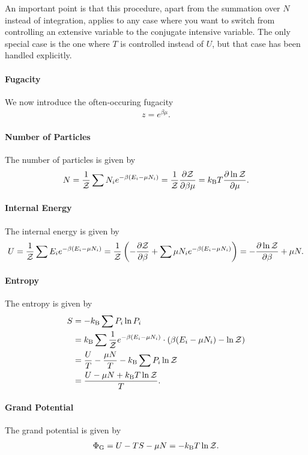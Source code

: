 An important point is that this procedure, apart from the summation over $N$ instead of integration, applies to any case where you want to switch from controlling an extensive variable to the conjugate intensive variable. The only special case is the one where $T$ is controlled instead of $U$, but that case has been handled explicitly.


\paragraph{Fugacity}
We now introduce the often-occuring fugacity
\begin{align*}
	z = e^{\beta\mu}.
\end{align*}

\paragraph{Number of Particles}
The number of particles is given by
\begin{align*}
	N = \frac{1}{\mathcal{Z}}\sum N_{i}e^{-\beta(E_{i} - \mu N_{i})} = \frac{1}{\mathcal{Z}}\pdv{\mathcal{Z}}{\beta\mu} = k_{\text{B}} T\pdv{\ln{\mathcal{Z}}}{\mu}.
\end{align*}

\paragraph{Internal Energy}
The internal energy is given by
\begin{align*}
	U = \frac{1}{\mathcal{Z}}\sum E_{i}e^{-\beta(E_{i} - \mu N_{i})} = \frac{1}{\mathcal{Z}}\left(-\pdv{\mathcal{Z}}{\beta} + \sum\mu N_{i}e^{-\beta(E_{i} - \mu N_{i})}\right) = -\pdv{\ln{\mathcal{Z}}}{\beta} + \mu N.
\end{align*}

\paragraph{Entropy}
The entropy is given by
\begin{align*}
	S &= -k_{\text{B}}\sum P_{i}\ln{P_{i}} \\
	  &= k_{\text{B}}\sum \frac{1}{\mathcal{Z}}e^{-\beta(E_{i} - \mu N_{i})}\cdot\left(\beta(E_{i} - \mu N_{i}) - \ln{\mathcal{Z}}\right) \\
	  &= \frac{U}{T} - \frac{\mu N}{T} - k_{\text{B}}\sum P_{i}\ln{\mathcal{Z}} \\
	  &= \frac{U - \mu N + k_{\text{B}} T\ln{\mathcal{Z}}}{T}.
\end{align*}

\paragraph{Grand Potential}
The grand potential is given by
\begin{align*}
	\Phi_{\text{G}} = U - TS - \mu N = -k_{\text{B}} T\ln{\mathcal{Z}}.
\end{align*}

